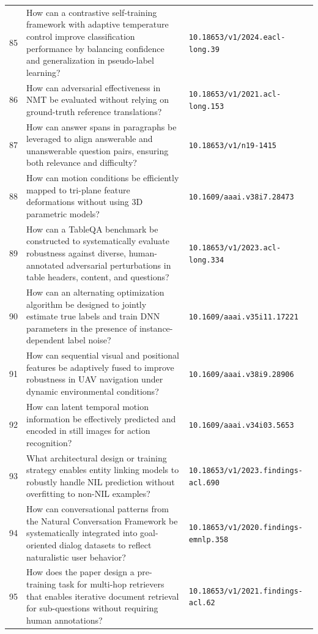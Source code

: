 \documentclass[runningheads]{llncs}
\begin{document}
\begin{longtable}{@{}p{0.5cm}p{7.2cm}p{2.5cm}@{}}
85 & How can a contrastive self-training framework with adaptive temperature control improve classification performance by balancing confidence and generalization in pseudo-label learning? & \texttt{10.18653/v1/2024.eacl-long.39} \\
86 & How can adversarial effectiveness in NMT be evaluated without relying on ground-truth reference translations? & \texttt{10.18653/v1/2021.acl-long.153} \\
87 & How can answer spans in paragraphs be leveraged to align answerable and unanswerable question pairs, ensuring both relevance and difficulty? & \texttt{10.18653/v1/n19-1415} \\
88 & How can motion conditions be efficiently mapped to tri-plane feature deformations without using 3D parametric models? & \texttt{10.1609/aaai.v38i7.28473} \\
89 & How can a TableQA benchmark be constructed to systematically evaluate robustness against diverse, human-annotated adversarial perturbations in table headers, content, and questions? & \texttt{10.18653/v1/2023.acl-long.334} \\
90 & How can an alternating optimization algorithm be designed to jointly estimate true labels and train DNN parameters in the presence of instance-dependent label noise? & \texttt{10.1609/aaai.v35i11.17221} \\
91 & How can sequential visual and positional features be adaptively fused to improve robustness in UAV navigation under dynamic environmental conditions? & \texttt{10.1609/aaai.v38i9.28906} \\
92 & How can latent temporal motion information be effectively predicted and encoded in still images for action recognition? & \texttt{10.1609/aaai.v34i03.5653} \\
93 & What architectural design or training strategy enables entity linking models to robustly handle NIL prediction without overfitting to non-NIL examples? & \texttt{10.18653/v1/2023.findings-acl.690} \\
94 & How can conversational patterns from the Natural Conversation Framework be systematically integrated into goal-oriented dialog datasets to reflect naturalistic user behavior? & \texttt{10.18653/v1/2020.findings-emnlp.358} \\
95 & How does the paper design a pre-training task for multi-hop retrievers that enables iterative document retrieval for sub-questions without requiring human annotations? & \texttt{10.18653/v1/2021.findings-acl.62} \\

\end{longtable}
\end{document}
